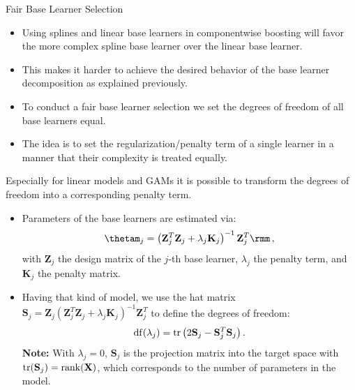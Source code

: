 
\begin{vbframe}{Fair Base Learner Selection}

\begin{itemize}

  \item
    Using splines and linear base learners in componentwise boosting will favor 
    the more complex spline base learner over the linear base learner.

  \item
    This makes it harder to achieve the desired behavior of the base learner 
    decomposition as explained previously.

  \item
    To conduct a fair base learner selection we set the degrees of freedom of all base learners equal.

  \item
    The idea is to set the regularization/penalty term of a single learner in a manner that their complexity is treated equally.

\end{itemize}

\framebreak


Especially for linear models and GAMs it is possible to transform the degrees of freedom into a corresponding penalty term.
\begin{itemize}

  \item
    Parameters of the base learners are estimated via:
    $$
    \thetam_j = \left(\mathbf{Z}_j^T \mathbf{Z}_j + \lambda_j \mathbf{K}_j
    \right)^{-1}\mathbf{Z}_j^T \rmm\,,
    $$
    with $\mathbf{Z}_j$ the design matrix of the $j$-th base learner, 
    $\lambda_j$ the penalty term, and $\mathbf{K}_j$ the penalty matrix.

  \item
    Having that kind of model, we use the hat matrix 
    $\mathbf{S}_j = \mathbf{Z}_j\left(\mathbf{Z}_j^T \mathbf{Z}_j + 
    \lambda_j \mathbf{K}_j\right)^{-1}\mathbf{Z}_j^T$ to define the degrees of 
    freedom:
    $$
    \operatorname{df}(\lambda_j) = \operatorname{tr}\left(2\mathbf{S}_j - \mathbf{S}_j^T
    \mathbf{S}_j\right).
    $$
    \textbf{Note:} With $\lambda_j = 0$, $\mathbf{S}_j$ is the projection matrix 
    into the target space with 
    $\operatorname{tr}(\mathbf{S}_j) = \operatorname{rank}(\mathbf{X})$, which corresponds to 
    the number of parameters in the model.


\end{itemize}
\end{vbframe}
